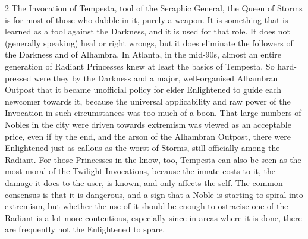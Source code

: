 \begin{multicols}{2}
The Invocation of Tempesta, tool of the Seraphic General, the Queen of Storms is for most of those who dabble in it, purely a weapon. It is something that is learned as a tool against the Darkness, and it is used for that role. It does not (generally speaking) heal or right wrongs, but it does eliminate the followers of the Darkness and of Alhambra. In Atlanta, in the mid-90s, almost an entire generation of Radiant Princesses knew at least the basics of Tempesta. So hard-pressed were they by the Darkness and a major, well-organised Alhambran Outpost that it became unofficial policy for elder Enlightened to guide each newcomer towards it, because the universal applicability and raw power of the Invocation in such circumstances was too much of a boon. That large numbers of Nobles in the city were driven towards extremism was viewed as an acceptable price, even if by the end, and the arson of the Alhambran Outpost, there were Enlightened just as callous as the worst of Storms, still officially among the Radiant.
 For those Princesses in the know, too, Tempesta can also be seen as the most moral of the Twilight Invocations, because the innate costs to it, the damage it does to the user, is known, and only affects the self. The common consensus is that it is dangerous, and a sign that a Noble is starting to spiral into extremism, but whether the use of it should be enough to ostracise one of the Radiant is a lot more contentious, especially since in areas where it is done, there are frequently not the Enlightened to spare.


\end{multicols}
